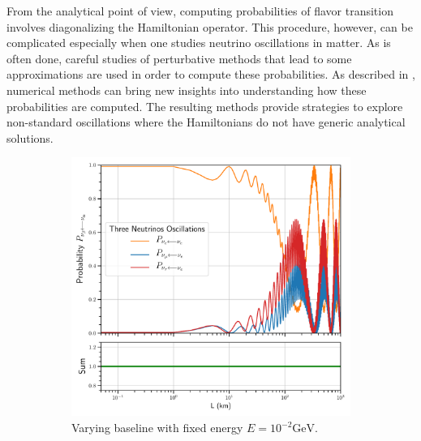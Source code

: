 \documentclass[twocolumn,secnumarabic,amssymb, nobibnotes, aps, prd,10pt]{revtex4-1}
\begin{document}
From the analytical point of view, computing probabilities of flavor transition involves
diagonalizing the Hamiltonian operator. This procedure, however, can be complicated especially
when one studies neutrino oscillations in matter. As is often done, careful studies of
perturbative methods that lead to some approximations are used in order to compute these
probabilities. As described in \cite{Bustamante:2019ggq}, numerical methods can bring new insights 
into understanding how these probabilities are computed. The resulting methods provide strategies
to explore non-standard oscillations where the Hamiltonians do not have generic analytical
solutions. 
\begin{figure}
\captionsetup[subfigure]{aboveskip=-1.5pt,belowskip=-1.5pt} 
\begin{subfigure}{1.05\linewidth}
\includegraphics[width=\linewidth]{Osc3VacuumBaseline.pdf}
\caption{Varying baseline with fixed energy $E=10^{-2} \mathrm{GeV}$.} 
\end{subfigure} 
\\
\begin{subfigure}{1.05\linewidth}

\end{subfigure}
\end{figure}
\end{document}
